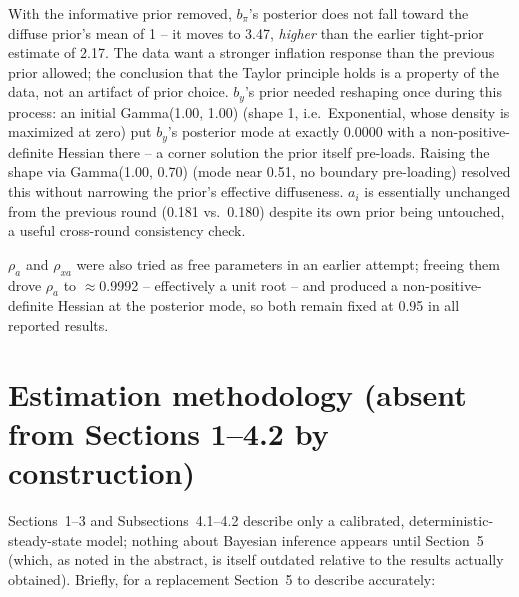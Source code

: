 \documentclass[11pt]{article}
\begin{document}
With the informative prior removed, $b_\pi$'s posterior does not fall
toward the diffuse prior's mean of 1 -- it moves to 3.47, \emph{higher}
than the earlier tight-prior estimate of 2.17. The data want a stronger
inflation response than the previous prior allowed; the conclusion that
the Taylor principle holds is a property of the data, not an artifact of
prior choice. $b_y$'s prior needed reshaping once during this process:
an initial Gamma(1.00, 1.00) (shape 1, i.e.\ Exponential, whose density
is maximized at zero) put $b_y$'s posterior mode at exactly 0.0000 with
a non-positive-definite Hessian there -- a corner solution the prior
itself pre-loads. Raising the shape via Gamma(1.00, 0.70) (mode near
0.51, no boundary pre-loading) resolved this without narrowing the
prior's effective diffuseness. $a_i$ is essentially unchanged from the
previous round (0.181 vs.\ 0.180) despite its own prior being untouched,
a useful cross-round consistency check.

$\rho_a$ and $\rho_{xa}$ were also tried as free parameters in an
earlier attempt; freeing them drove $\rho_a$ to $\approx$0.9992 --
effectively a unit root -- and produced a non-positive-definite Hessian
at the posterior mode, so both remain fixed at 0.95 in all reported
results.

\section{Estimation methodology (absent from Sections 1--4.2 by construction)}

Sections~1--3 and Subsections~4.1--4.2 describe only a calibrated,
deterministic-steady-state model; nothing about Bayesian inference
appears until Section~5 (which, as noted in the abstract, is itself
outdated relative to the results actually obtained). Briefly, for a
replacement Section~5 to describe accurately:
\end{document}
